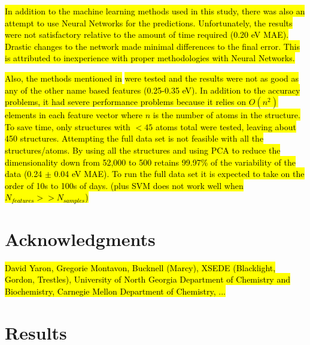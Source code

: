 \documentclass[10pt]{article}
\begin{document}
\hl{In addition to the machine learning methods used in this study, there was also an attempt to use Neural Networks for the predictions. Unfortunately, the results were not satisfactory relative to the amount of time required (0.20 eV MAE). Drastic changes to the network made minimal differences to the final error. This is attributed to inexperience with proper methodologies with Neural Networks.}

\hl{Also, the methods mentioned in }\cite{hansen_assessment_2013} \hl{were tested and the results were not as good as any of the other name based features (0.25-0.35 eV). In addition to the accuracy problems, it had severe performance problems because it relies on $O(n^2)$ elements in each feature vector where $n$ is the number of atoms in the structure. To save time, only structures with $<45$ atoms total were tested, leaving about 450 structures. Attempting the full data set is not feasible with all the structures/atoms. By using all the structures and using PCA to reduce the dimensionality down from 52,000 to 500 retains 99.97\% of the variability of the data (0.24 $\pm$ 0.04 eV MAE). To run the full data set it is expected to take on the order of 10s to 100s of days. (plus SVM does not work well when $N_{features} >> N_{samples}$)}

\section{Acknowledgments}

\hl{David Yaron, Gregorie Montavon, Bucknell (Marcy), XSEDE (Blacklight, Gordon, Trestles), University of North Georgia Department of Chemistry and Biochemistry, Carnegie Mellon Department of Chemistry, ...}

\nocite{ruddigkeit_enumeration_2012}
\nocite{darley_beyond_2008}
\nocite{frisch_gaussian_2009}
\nocite{montavon_machine_2013}
\nocite{handley_dynamically_2009}
\nocite{hansen_assessment_2013}
\nocite{schutt_how_2013}
\nocite{reymond_exploring_2012}
\nocite{whitfield_computational_2013}
\nocite{hansen_assessment_2013-1}
\nocite{ra_dft_2008}
\nocite{martell_assessment_1997}
\nocite{montavon_learning_2012}
\nocite{domingos_few_2012}
\nocite{martin_benchmark_1997}
\nocite{handley_potential_2010}
\nocite{rupp_fast_2012}


\newpage
\appendix

\section{Results}
\end{document}
